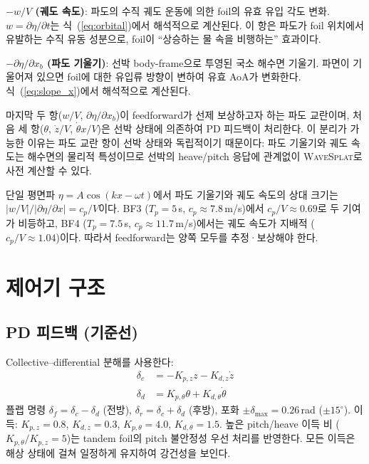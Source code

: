 \documentclass[11pt]{report}
\numberwithin{equation}{chapter}
\numberwithin{figure}{chapter}
\numberwithin{table}{chapter}
\newcommand{\WS}{\textsc{WaveSplat}}
\begin{document}
\textbf{$-w/V$ (궤도 속도)}: 파도의 수직 궤도 운동에 의한 foil의 유효 유입 각도 변화.
$w = \partial\eta/\partial t$는 식~(\ref{eq:orbital})에서 해석적으로 계산된다.
이 항은 파도가 foil 위치에서 유발하는 수직 유동 성분으로,
foil이 ``상승하는 물 속을 비행하는'' 효과이다.

\textbf{$-\partial\eta/\partial x_b$ (파도 기울기)}: 선박 body-frame으로 투영된
국소 해수면 기울기. 파면이 기울어져 있으면 foil에 대한 유입류 방향이 변하여
유효 AoA가 변화한다. 식~(\ref{eq:slope_x})에서 해석적으로 계산된다.

마지막 두 항($w/V$, $\partial\eta/\partial x_b$)이
feedforward가 선제 보상하고자 하는 파도 교란이며,
처음 세 항($\theta$, $\dot{z}/V$, $\dot{\theta}x/V$)은
선박 상태에 의존하여 PD 피드백이 처리한다.
이 분리가 가능한 이유는 파도 교란 항이 선박 상태와 독립적이기 때문이다:
파도 기울기와 궤도 속도는 해수면의 물리적 특성이므로
선박의 heave/pitch 응답에 관계없이 \WS{}로 사전 계산할 수 있다.

단일 평면파 $\eta = A\cos(kx - \omega t)$에서 파도 기울기와 궤도 속도의
상대 크기는 $|w/V| / |\partial\eta/\partial x| = c_p / V$이다.
BF3 ($T_p=5$\,s, $c_p \approx 7.8$\,m/s)에서 $c_p/V \approx 0.69$로
두 기여가 비등하고, BF4 ($T_p=7.5$\,s, $c_p \approx 11.7$\,m/s)에서는
궤도 속도가 지배적 ($c_p/V \approx 1.04$)이다.
따라서 feedforward는 양쪽 모두를 추정·보상해야 한다.

\section{제어기 구조}
\label{sec:controller}

\subsection{PD 피드백 (기준선)}

Collective--differential 분해를 사용한다:
\begin{align}
  \delta_c &= -K_{p,z} z - K_{d,z} \dot{z} \\
  \delta_d &= K_{p,\theta} \theta + K_{d,\theta} \dot{\theta}
\end{align}
플랩 명령 $\delta_f = \delta_c - \delta_d$ (전방), $\delta_r = \delta_c + \delta_d$ (후방),
포화 $\pm \delta_{\max} = 0.26$\,rad ($\pm 15^\circ$).
이득: $K_{p,z}=0.8$, $K_{d,z}=0.3$, $K_{p,\theta}=4.0$, $K_{d,\theta}=1.5$.
높은 pitch/heave 이득 비 ($K_{p,\theta}/K_{p,z} = 5$)는 tandem foil의
pitch 불안정성 우선 처리를 반영한다.
모든 이득은 해상 상태에 걸쳐 일정하게 유지하여 강건성을 보인다.
\end{document}
